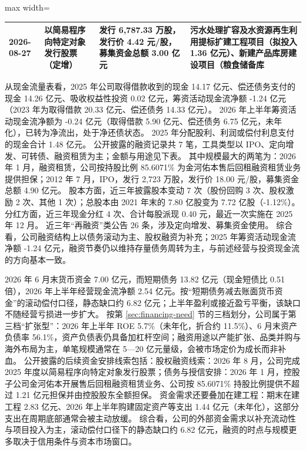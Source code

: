 \begin{center}
\begin{adjustbox}{max width=\textwidth}
\begin{tabular}{@{}p{1.45cm}p{2.55cm}p{4.05cm}p{4.95cm}@{}}
2026-08-27 & 以简易程序向特定对象发行股票（定增） & 发行 6,\allowbreak{}787.33 万股，\allowbreak{}发行价 4.42 元/\allowbreak{}股，\allowbreak{}募集资金总额 3.00 亿元 & 污水处理扩容及水资源再生利用提标扩建工程项目（拟投入 1.36 亿元）、\allowbreak{}新建产品库房建设项目（粮食储备库 \\
\bottomrule
\end{tabular}
\end{adjustbox}
\end{center}

 从现金流量表看，2025 年公司取得借款收到的现金 14.17 亿元、偿还债务支付的现金 14.26 亿元、吸收权益性投资 0.02 亿元，筹资活动现金流净额 -1.24 亿元（2023 年为取得借款 20.33 亿元、偿还债务 14.33 亿元）。 2026 年上半年筹资活动现金流净额为 -0.24 亿元（取得借款 5.90 亿元、偿还债务 6.75 亿元，未年化），已转为净流出，处于净还债状态。 2025 年分配股利、利润或偿付利息支付的现金合计 1.48 亿元。 公开披露的融资记录共 7 笔，工具类型以 IPO、定向增发、可转债、融资租赁为主；金额与用途见下表。 其中规模最大的两笔为：2026 年 1 月，融资租赁，公司按持股比例 85.6071\% 为金河佑本售后回租融资租赁业务提供担保；2012 年 7 月，IPO，发行 2,723 万股，发行价 18.00 元/股，募集资金总额 4.90 亿元。 股本方面，近三年披露股本变动 7 次（股份回购 3 次、股权激励 2 次、其他 1 次）；总股本由 2021 年末的 7.80 亿股变为 7.72 亿股（-1.12\%）。 分红方面，近三年现金分红 4 次、合计每股派现 0.40 元，最近一次实施在 2025 年 12 月。 近三年“再融资”类公告 26 条，涉及定向增发、募集资金使用。 综合看，公司融资结构上以债务滚动为主、股权融资为补充；2025 年筹资活动现金流净额 -1.24 亿元，融资节奏仍以维持存量债务周转为主，与前述经营与投资现金流的方向基本一致。

 2026 年 6 月末货币资金 7.00 亿元，而短期债务 13.82 亿元（现金短债比 0.51 倍），2026 年上半年经营现金流净额 2.54 亿元。按“短期债务减去账面货币资金”的滚动偿付口径，静态缺口约 6.82 亿元；上半年盈利或接近盈亏平衡，该缺口不随经营亏损进一步扩大。 按第 \ref{sec:financing-need} 节的三档划分，公司属于第三档“扩张型”：2026 年上半年 ROE 5.7\%（未年化，折合约 11.5\%）、6 月末资产负债率 56.1\%，资产负债表仍具备加杠杆空间；融资用途以产能扩张、品类并购与海外布局为主，单笔规模通常在 5---20 亿元量级，会被市场定价为成长而非补血。 公开披露的后续资金安排线索包括：股权融资线索：2026 年 8 月，公司完成 2025 年度以简易程序向特定对象发行股票；债务与授信安排：2026 年 1 月，控股子公司金河佑本开展售后回租融资租赁业务、公司按 85.6071\% 持股比例提供不超过 1.21 亿元担保并由控股股东全额担保。 资金需求还要叠加在建工程：期末在建工程 2.83 亿元、2026 年上半年购建固定资产等支出 1.44 亿元（未年化），这部分支出在周期底部通常会被主动放缓。 综合看，公司的外部资金需求以补充流动性与项目投入为主，滚动偿付口径下的静态缺口约 6.82 亿元，融资的时点与规模更多取决于信用条件与资本市场窗口。




